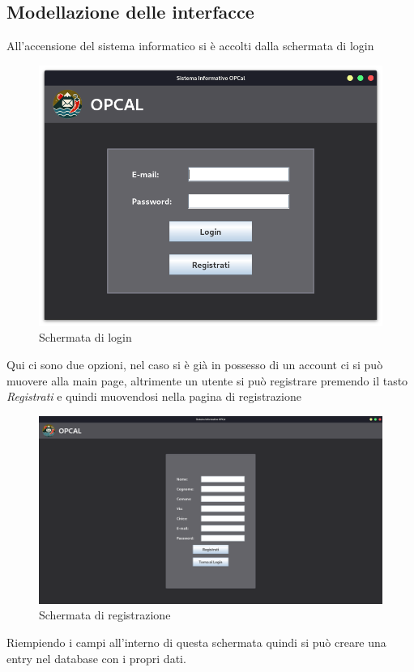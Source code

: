 \subsection{Modellazione delle interfacce}
All'accensione del sistema informatico si è accolti dalla schermata di login
\begin{figure}[H]
	\includegraphics[width=\textwidth]{assets/login_page.png}
	\caption{Schermata di login}
\end{figure}
Qui ci sono due opzioni, nel caso si è già in possesso di un account ci si può muovere alla main page, altrimente un utente si può registrare premendo il tasto \textit{Registrati} e quindi muovendosi nella pagina di registrazione
\begin{figure}[H]
	\includegraphics[width=\textwidth]{assets/registration_page.png}
	\caption{Schermata di registrazione}
\end{figure}
Riempiendo i campi all'interno di questa schermata quindi si può creare una entry nel database con i propri dati.

